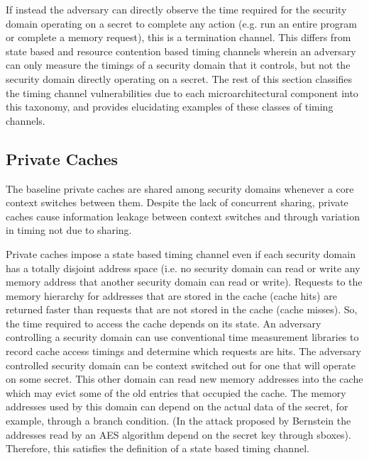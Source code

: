 If instead the adversary can directly observe the time required for the 
security domain operating on a secret to complete any action (e.g. run an 
entire program or complete a memory request), this is a termination channel.  
This differs from state based and resource contention based timing channels 
wherein an adversary can only measure the timings of a security domain that it 
controls, but not the security domain directly operating on a secret. The rest 
of this section classifies the timing channel vulnerabilities due to each 
microarchitectural component into this taxonomy, and provides elucidating 
examples of these classes of timing channels.

\subsection{Private Caches}
The baseline private caches are shared among security domains whenever a core 
context switches between them. Despite the lack of concurrent sharing, private 
caches cause information leakage between context switches and through variation 
in timing not due to sharing.

Private caches impose a state based timing channel even if each security domain 
has a totally disjoint address space (i.e. no security domain can read or write 
any memory address that another security domain can read or write). Requests to 
the memory hierarchy for addresses that are stored in the cache (cache hits) 
are returned faster than requests that are not stored in the cache (cache 
misses). So, the time required to access the cache depends on its state. An 
adversary controlling a security domain can use conventional time measurement 
libraries to record cache access timings and determine which requests are hits.
The adversary controlled security domain can be context switched out for one 
that will operate on some secret. This other domain can read new memory 
addresses into the cache which may evict some of the old entries that occupied 
the cache. The memory addresses used by this domain can depend on the actual 
data of the secret, for example, through a branch condition. (In the attack 
proposed by Bernstein \cite{bernstein} the addresses read by an AES algorithm 
depend on the secret key through sboxes). Therefore, this satisfies the 
definition of a state based timing channel.

